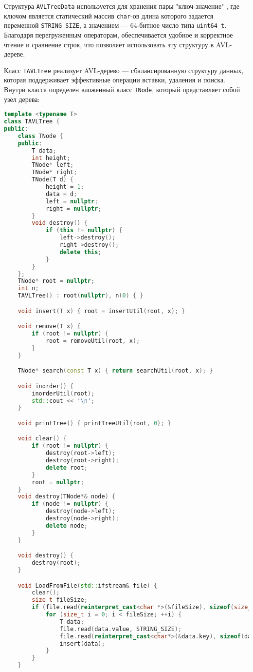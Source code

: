 \documentclass[12pt]{article}
\begin{document}
Структура \texttt{AVLTreeData} используется для хранения пары "ключ-значение" , где ключом является статический массив \texttt{char}-ов длина которого задается переменной \texttt{STRING\_SIZE}, а значением — 64-битное число типа \texttt{uint64\_t}. Благодаря перегруженным операторам, обеспечивается удобное и корректное чтение и сравнение строк, что позволяет использовать эту структуру в AVL-дереве.

Класс \texttt{TAVLTree} реализует AVL-дерево — сбалансированную структуру данных, которая поддерживает эффективные операции вставки, удаления и поиска. Внутри класса определен вложенный класс \texttt{TNode}, который представляет собой узел дерева:

\begin{lstlisting}[language=C++]
template <typename T> 
class TAVLTree {
public:
    class TNode {
    public:
        T data;
        int height;
        TNode* left;
        TNode* right;
        TNode(T d) {
            height = 1;
            data = d;
            left = nullptr;
            right = nullptr;
        }
        void destroy() {
            if (this != nullptr) {
                left->destroy();
                right->destroy();
                delete this;
            }
        }
    };
    TNode* root = nullptr;
    int n;
    TAVLTree() : root(nullptr), n(0) { }

    void insert(T x) { root = insertUtil(root, x); }

    void remove(T x) {
        if (root != nullptr) {
            root = removeUtil(root, x);
        }
    }

    TNode* search(const T x) { return searchUtil(root, x); }

    void inorder() {
        inorderUtil(root);
        std::cout << '\n';
    }

    void printTree() { printTreeUtil(root, 0); }

    void clear() {
        if (root != nullptr) {
            destroy(root->left);
            destroy(root->right);
            delete root;
        }
        root = nullptr;
    }
    void destroy(TNode*& node) {
        if (node != nullptr) {
            destroy(node->left);
            destroy(node->right);
            delete node;
        }
    }

    void destroy() {
        destroy(root);
    }

    void LoadFromFile(std::ifstream& file) {
        clear();
        size_t fileSize;
        if (file.read(reinterpret_cast<char *>(&fileSize), sizeof(size_t))) {
            for (size_t i = 0; i < fileSize; ++i) {
                T data;
                file.read(data.value, STRING_SIZE);
                file.read(reinterpret_cast<char*>(&data.key), sizeof(data.key));
                insert(data);
            }
        }
    }


\end{lstlisting}
\end{document}
